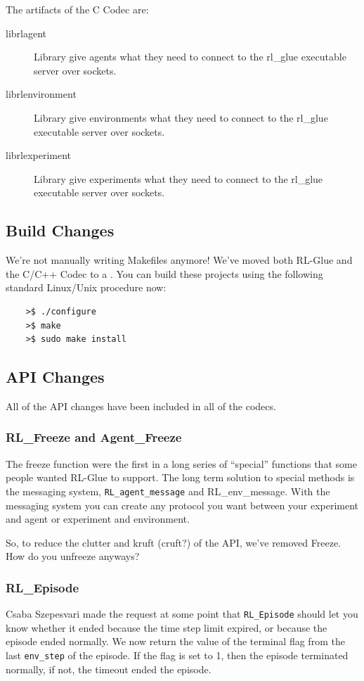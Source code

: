 \documentclass[11pt]{article}
\begin{document}
The artifacts of the C Codec are:
\begin{description}
	\item [librlagent] Library give agents what they need to connect to the rl\_glue executable server over sockets.
	\item [librlenvironment] Library give environments what they need to connect to the rl\_glue executable server over sockets.
	\item [librlexperiment] Library give experiments what they need to connect to the rl\_glue executable server over sockets.
\end{description}

\subsection{Build Changes}
We're not manually writing Makefiles anymore!  We've moved both RL-Glue and the C/C++ Codec to a . You can build these projects using the following standard Linux/Unix procedure now:
\begin{verbatim}
	>$ ./configure
	>$ make
	>$ sudo make install
\end{verbatim}

\subsection{API Changes}
All of the API changes have been included in all of the codecs.

\subsubsection{RL\_Freeze and Agent\_Freeze}
The freeze function were the first in a long series of ``special'' functions that some people wanted RL-Glue to support.  The long term solution to special methods is the messaging system, \texttt{RL\_agent\_message} and RL\_env\_message. With the messaging system you can create any protocol you want between your experiment and agent or experiment and environment.

So, to reduce the clutter and kruft (cruft?) of the API, we've removed Freeze.  How do you unfreeze anyways?

\subsubsection{RL\_Episode}
Csaba Szepesvari made the request at some point that \texttt{RL\_Episode} should let you know whether it ended because the time step limit expired, or because the episode ended normally.  We now return the value of the terminal flag from the last \texttt{env\_step} of the episode. If the flag is set to 1, then the episode terminated normally, if not, the timeout ended the episode.  
\end{document}
